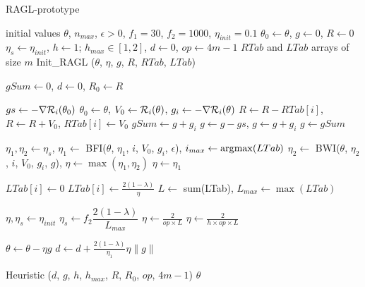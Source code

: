 \begin{algorithm}[h!]
	\caption{RAGL-prototype}
	\label{algo_RAGL_proto}
	\begin{algorithmic}[1]
		\REQUIRE initial values $\theta$, $n_{max}$, $\epsilon>0$, $f_1=30$, $f_2=1000$, $\eta_{init}=0.1$ 
		\STATE $\theta_0 \leftarrow \theta$, $g \leftarrow 0$, $R \leftarrow 0$
		\STATE $\eta_s \leftarrow \eta_{init}$, $h\leftarrow 1$; $h_{max}\in [1,2]$, $d\leftarrow 0$, $op\leftarrow 4m-1$
		\STATE $RTab$ and $LTab$ arrays of size $m$
		\STATE Init\_RAGL ($\theta$, $\eta$, $g$, $R$, $RTab$, $LTab$)
		
		\STATE $gSum \leftarrow 0$, $d\leftarrow 0$, $R_0 \leftarrow R$
		
		
		\STATE $gs \leftarrow -\nabla \mathcal{R}_i(\theta_0)$
		\ENDIF
		\STATE $\theta_0 \leftarrow \theta$, $V_0 \leftarrow \mathcal{R}_i(\theta)$, $g_i \leftarrow -\nabla \mathcal{R}_i(\theta)$
		\STATE $R \leftarrow R-RTab[i]$, $R \leftarrow R+V_0$, $RTab[i] \leftarrow V_0$
		\STATE $gSum \leftarrow g+g_i$
		\STATE $g \leftarrow g-gs$, $g \leftarrow g+g_i$
		\ELSE
		\STATE $g \leftarrow gSum$
		\ENDIF
		
		\STATE $\eta_1, \eta_2 \leftarrow \eta_s$, $\eta_1 \leftarrow$ BFI($\theta$, $\eta_1$, $i$, $V_0$, $g_i$, $\epsilon$), $i_{max} \leftarrow \operatorname*{\arg\!\max}(LTab)$
		\STATE $\eta_2 \leftarrow$ BWI($\theta$, $\eta_2$, $i$, $V_0$, $g_i$, $g$), $\eta \leftarrow \max(\eta_1,\eta_2)$
		\ELSE
		\STATE $\eta \leftarrow \eta_1$
		\ENDIF
		
		\STATE $LTab[i] \leftarrow 0$
		\ELSE
		\STATE $LTab[i] \leftarrow \frac{2(1-\lambda)}{\eta}$
		\ENDIF
		\STATE $L \leftarrow$ sum(LTab), $L_{max} \leftarrow \max(LTab)$
		
		\STATE $\eta,\eta_s \leftarrow \eta_{init}$
		\ELSE
		\STATE $\eta_s \leftarrow f_2\dfrac{2(1-\lambda)}{L_{max}}$
		\STATE $\eta \leftarrow \frac{2}{op \times L}$
		\ELSE
		\STATE $\eta \leftarrow \frac{2}{h \times op \times L}$
		\ENDIF
		\ENDIF
		
		\STATE $\theta \leftarrow \theta -\eta g$
		\STATE $d \leftarrow d+\frac{2(1-\lambda)}{\eta_1}\eta \|g\|$
		\ENDIF
		
		\ENDFOR
		\STATE Heuristic ($d$, $g$, $h$, $h_{max}$, $R$, $R_0$, $op$, $4m-1$)
		\ENDWHILE
		\RETURN $\theta$
	\end{algorithmic}
\end{algorithm}


